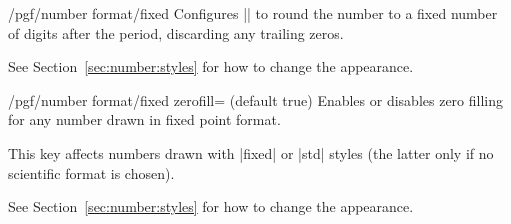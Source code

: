 \documentclass[a4paper]{ltxdoc}
\begin{document}
\begin{key}{/pgf/number format/fixed}
    Configures |\pgfmathprintnumber| to round the number to a fixed number of
    digits after the period, discarding any trailing zeros.
\begin{codeexample}[]
\hspace{1em}
\hspace{1em}
\hspace{1em}
\hspace{1em}
\end{codeexample}

    See Section~\ref{sec:number:styles} for how to change the appearance.
\end{key}

\begin{key}{/pgf/number format/fixed zerofill=  (default true)}
    Enables or disables zero filling for any number drawn in fixed point
    format.
\begin{codeexample}[]
\hspace{1em}
\hspace{1em}
\hspace{1em}
\hspace{1em}
\end{codeexample}
    This key affects numbers drawn with |fixed| or |std| styles (the latter
    only if no scientific format is chosen).
\begin{codeexample}[]
\hspace{1em}
\hspace{1em}
\hspace{1em}
\end{codeexample}

    See Section~\ref{sec:number:styles} for how to change the appearance.
\end{key}
\end{document}
